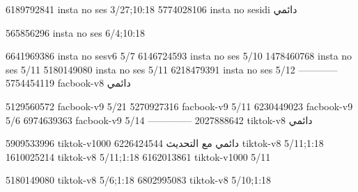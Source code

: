 
6189792841 insta no ses
3/27;10:18
5774028106 insta no sesidi
دائمي


565856296 insta no ses
6/4;10:18

6641969386 insta no sesv6
5/7
6146724593 insta no ses
5/10
1478460768 insta no ses
5/11
5180149080 insta no ses
5/11
6218479391 insta no ses
5/12
------------
5754454119 facbook-v8
دائمي

5129560572 facbook-v9
5/21
5270927316 facbook-v9
5/11
6230449023 facbook-v9
5/6
6974639363 facbook-v9
5/14
--------------
2027888642 tiktok-v8
دائمي

5909533996 tiktok-v1000
دائمي مع التحديث
6226424544 tiktok-v8
5/11;1:18
1610025214 tiktok-v8
5/11;1:18
6162013861 tiktok-v1000
5/11

5180149080 tiktok-v8
5/6;1:18
6802995083 tiktok-v8
5/10;1:18
